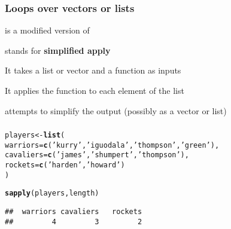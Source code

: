 \documentclass[12pt]{beamer}\usepackage[]{graphicx}\usepackage[]{color}
\makeatletter
\newcommand{\hlstr}[1]{\textcolor[rgb]{0.192,0.494,0.8}{#1}}%
\newcommand{\hlstd}[1]{\textcolor[rgb]{0.345,0.345,0.345}{#1}}%
\newcommand{\hlkwb}[1]{\textcolor[rgb]{0.69,0.353,0.396}{#1}}%
\newcommand{\hlkwc}[1]{\textcolor[rgb]{0.333,0.667,0.333}{#1}}%
\newcommand{\hlkwd}[1]{\textcolor[rgb]{0.737,0.353,0.396}{\textbf{#1}}}%
\newenvironment{kframe}{%
 \def\at@end@of@kframe{}%
 \ifinner\ifhmode%
  \def\at@end@of@kframe{\end{minipage}}%
  \begin{minipage}{\columnwidth}%
 \fi\fi%
 \def\FrameCommand##1{\hskip\@totalleftmargin \hskip-\fboxsep
 \colorbox{shadecolor}{##1}\hskip-\fboxsep
     \hskip-\linewidth \hskip-\@totalleftmargin \hskip\columnwidth}%
 \MakeFramed {\advance\hsize-\width
   \@totalleftmargin\z@ \linewidth\hsize
   \@setminipage}}%
 {\par\unskip\endMakeFramed%
 \at@end@of@kframe}
\newenvironment{knitrout}{}{} %
\makeatother
\begin{document}

\begin{frame}
\frametitle{Loops over vectors or lists}

\bi
  \item {} is a modified version of {\hilit {}}
  \item {} stands for \textbf{simplified apply}
  \item It takes a list or vector and a function as inputs
  \item It applies the function to each element of the list
  \item {} attempts to simplify the output (possibly as a vector or list)
\ei

\end{frame}


\begin{frame}[fragile]
\frametitle{}

\begin{knitrout}\footnotesize
{}\color{fgcolor}\begin{kframe}
\begin{alltt}
\hlstd{players} \hlkwb{<-} \hlkwd{list}\hlstd{(}
  \hlkwc{warriors} \hlstd{=} \hlkwd{c}\hlstd{(}\hlstr{'kurry'}\hlstd{,} \hlstr{'iguodala'}\hlstd{,} \hlstr{'thompson'}\hlstd{,} \hlstr{'green'}\hlstd{),}
  \hlkwc{cavaliers} \hlstd{=} \hlkwd{c}\hlstd{(}\hlstr{'james'}\hlstd{,} \hlstr{'shumpert'}\hlstd{,} \hlstr{'thompson'}\hlstd{),}
  \hlkwc{rockets} \hlstd{=} \hlkwd{c}\hlstd{(}\hlstr{'harden'}\hlstd{,} \hlstr{'howard'}\hlstd{)}
\hlstd{)}

\hlkwd{sapply}\hlstd{(players, length)}
\end{alltt}
\begin{verbatim}
##  warriors cavaliers   rockets 
##         4         3         2
\end{verbatim}
\end{kframe}
\end{knitrout}

\end{frame}

\end{document}
